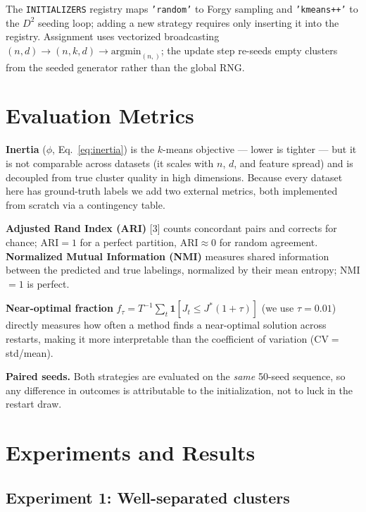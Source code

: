 \documentclass[11pt,a4paper]{article}
\begin{document}
The \texttt{INITIALIZERS} registry maps \texttt{'random'} to Forgy sampling and
\texttt{'kmeans++'} to the $D^2$ seeding loop; adding a new strategy requires only
inserting it into the registry. Assignment uses vectorized broadcasting
$(n,d)\to(n,k,d)\to\text{argmin}_{(n,)}$; the update step re-seeds empty clusters
from the seeded generator rather than the global RNG.

\section{Evaluation Metrics}

\textbf{Inertia} ($\phi$, Eq.~\ref{eq:inertia}) is the $k$-means objective — lower is
tighter — but it is not comparable across datasets (it scales with $n$, $d$, and feature
spread) and is decoupled from true cluster quality in high dimensions.
Because every dataset here has ground-truth labels we add two external metrics, both
implemented from scratch via a contingency table.

\textbf{Adjusted Rand Index (ARI)} [3] counts concordant pairs
and corrects for chance; ARI$=1$ for a perfect partition, ARI$\approx0$ for random
agreement. \textbf{Normalized Mutual Information (NMI)} measures shared information
between the predicted and true labelings, normalized by their mean entropy; NMI$=1$ is
perfect.

\textbf{Near-optimal fraction} $f_\tau = T^{-1}\sum_t\mathbf{1}[J_t\leq J^*(1+\tau)]$
(we use $\tau=0.01$) directly measures how often a method finds a near-optimal
solution across restarts, making it more interpretable than the coefficient of variation
(CV$=$std/mean).

\textbf{Paired seeds.} Both strategies are evaluated on the \emph{same} 50-seed
sequence, so any difference in outcomes is attributable to the initialization, not
to luck in the restart draw.

\section{Experiments and Results}

\subsection{Experiment 1: Well-separated clusters}
\label{sec:exp1}
\end{document}
